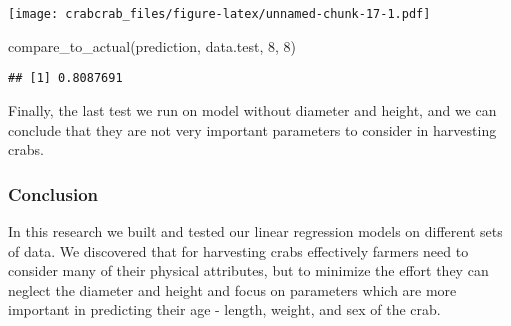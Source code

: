 \documentclass[
]{article}
\newenvironment{Shaded}{\begin{snugshade}}{\end{snugshade}}
\newcommand{\AttributeTok}[1]{\textcolor[rgb]{0.77,0.63,0.00}{#1}}
\newcommand{\DecValTok}[1]{\textcolor[rgb]{0.00,0.00,0.81}{#1}}
\newcommand{\FunctionTok}[1]{\textcolor[rgb]{0.00,0.00,0.00}{#1}}
\newcommand{\NormalTok}[1]{#1}
\newcommand{\OtherTok}[1]{\textcolor[rgb]{0.56,0.35,0.01}{#1}}
\newcommand{\SpecialCharTok}[1]{\textcolor[rgb]{0.00,0.00,0.00}{#1}}
\newcommand{\StringTok}[1]{\textcolor[rgb]{0.31,0.60,0.02}{#1}}
\begin{document}
\begin{Shaded}
\end{Shaded}

\texttt{[image: crabcrab\_files/figure-latex/unnamed-chunk-17-1.pdf]}

\begin{Shaded}
\begin{Highlighting}[]
\FunctionTok{compare\_to\_actual}\NormalTok{(prediction, data.test, }\DecValTok{8}\NormalTok{, }\DecValTok{8}\NormalTok{)}
\end{Highlighting}
\end{Shaded}

\begin{verbatim}
## [1] 0.8087691
\end{verbatim}

Finally, the last test we run on model without diameter and height, and
we can conclude that they are not very important parameters to consider
in harvesting crabs.

\hypertarget{conclusion}{%
\subsubsection{Conclusion}\label{conclusion}}

In this research we built and tested our linear regression models on
different sets of data. We discovered that for harvesting crabs
effectively farmers need to consider many of their physical attributes,
but to minimize the effort they can neglect the diameter and height and
focus on parameters which are more important in predicting their age -
length, weight, and sex of the crab.
\end{document}
